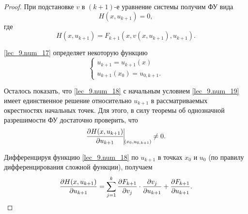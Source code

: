 \documentclass[../../main.tex]{subfiles}
\begin{document}
\begin{proof}
    При подстановке $v$ в $(k+1)$-е уравнение системы
    получим ФУ вида
    \begin{equation}
        \label{lec_9.num_17}
        H(x, u_{k+1}) = 0,
    \end{equation}
    где
    \begin{equation}
        \label{lec_9.num_18}
        H(x, u_{k+1}) = 
        F_{k+1}\left(x, v(x, u_{k+1}), 
        u_{k+1}\right).
    \end{equation}
    
    \eqref{lec_9.num_17} определяет некоторую функцию
    \begin{equation}
        \label{lec_9.num_19}
        \begin{cases}
        u_{k+1} = u_{k+1}(x)\\
        u_{k+1}(x_0) = u_{0,k+1}.
        \end{cases}
    \end{equation}
    
    Осталось показать, что \eqref{lec_9.num_18} с начальным
    условием \eqref{lec_9.num_19} имеет единственное решение относительно 
    $u_{k+1}$ в рассматриваемых окрестностях начальных
    точек. Для этого, в силу теоремы об однозначной 
    разрешимости ФУ
    достаточно проверить, что
    \begin{equation}
    \label{lec_9.num_20}
    \pderiv{H(x, u_{k+1})}{u_{k+1}} 
    \vline\underset{\left(x_0, u_{0,k+1}\right)}{} \neq 0.
    \end{equation}
    
    Дифференцируя функцию \eqref{lec_9.num_18}
    по $u_{k+1}$ в точках $x_0$ и $u_0$ (по правилу
    дифференцирования сложной функции), получаем
    \begin{equation}
        \label{lec_9.num_22}
        \frac{\partial H(x, u_{k+1})}{\partial u_{k+1}}  =
        \sum_{j = 1}^{k}
        \frac{\partial F_{k+1}}{\partial v_j} \cdot \frac{\partial v_j}{\partial u_{k+1}} + 
        \frac{\partial F_{k+1}}{\partial u_{k+1}}.
    \end{equation}
    

\end{proof}
\end{document}
